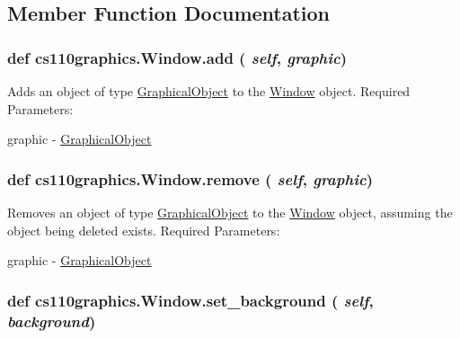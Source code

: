 \subsection{Member Function Documentation}
\hypertarget{classcs110graphics_1_1Window_a34064de02d5149841a23764e78085d18}{
\subsubsection[{add}]{\setlength{\rightskip}{0pt plus 5cm}def cs110graphics.Window.add ( {\em self}, \/   {\em graphic})}}
\label{classcs110graphics_1_1Window_a34064de02d5149841a23764e78085d18}


Adds an object of type \hyperlink{classcs110graphics_1_1GraphicalObject}{GraphicalObject} to the \hyperlink{classcs110graphics_1_1Window}{Window} object. Required Parameters:
\begin{DoxyItemize}
\item graphic -\/ \hyperlink{classcs110graphics_1_1GraphicalObject}{GraphicalObject} 
\end{DoxyItemize}\hypertarget{classcs110graphics_1_1Window_a14aba875d32f8a70a0c5a80ac3f18a92}{
\subsubsection[{remove}]{\setlength{\rightskip}{0pt plus 5cm}def cs110graphics.Window.remove ( {\em self}, \/   {\em graphic})}}
\label{classcs110graphics_1_1Window_a14aba875d32f8a70a0c5a80ac3f18a92}


Removes an object of type \hyperlink{classcs110graphics_1_1GraphicalObject}{GraphicalObject} to the \hyperlink{classcs110graphics_1_1Window}{Window} object, assuming the object being deleted exists. Required Parameters:
\begin{DoxyItemize}
\item graphic -\/ \hyperlink{classcs110graphics_1_1GraphicalObject}{GraphicalObject} 
\end{DoxyItemize}\hypertarget{classcs110graphics_1_1Window_a981a3115f1f22099549117313f38333c}{
\subsubsection[{set\_\-background}]{\setlength{\rightskip}{0pt plus 5cm}def cs110graphics.Window.set\_\-background ( {\em self}, \/   {\em background})}}
\label{classcs110graphics_1_1Window_a981a3115f1f22099549117313f38333c}


